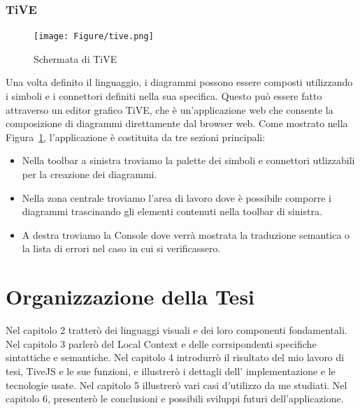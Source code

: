             \subsubsection{TiVE}

                \begin{figure}[htbp]
                    \centering
                    \texttt{[image: Figure/tive.png]}
                    \caption{Schermata di TiVE}
                    \label{fig:tive}
                \end{figure}

                Una volta definito il linguaggio, i diagrammi possono essere composti utilizzando i simboli e i connettori definiti nella sua specifica. Questo può essere fatto attraverso un editor grafico TiVE, che è un'applicazione web che consente la composizione di diagrammi direttamente dal browser web.
                \newline
                Come mostrato nella Figura~\ref{fig:tive}, l'applicazione è costituita da tre sezioni principali:
                \begin{itemize}
                    \item Nella toolbar a sinistra troviamo la palette dei simboli e connettori utlizzabili per la creazione dei diagrammi.
                    \item Nella zona centrale troviamo l'area di lavoro dove è possibile comporre i diagrammi trascinando gli elementi contenuti nella toolbar di sinistra.
                    \item A destra troviamo la Console dove verrà mostrata la traduzione semantica o la lista di errori nel caso in cui si verificassero.
                \end{itemize}

    \section{Organizzazione della Tesi}
        Nel capitolo 2 tratterò dei linguaggi visuali e dei loro componenti fondamentali. Nel capitolo 3 parlerò del Local Context e delle corrsipondenti specifiche sintattiche e semantiche. Nel capitolo 4 introdurrò il risultato del mio lavoro di tesi, TiveJS e le sue funzioni, e illustrerò  i dettagli dell' implementazione e le tecnologie usate. Nel capitolo 5 illustrerò vari casi d'utilizzo da me studiati. Nel capitolo 6, presenterò le conclusioni e possibili sviluppi futuri dell'applicazione.